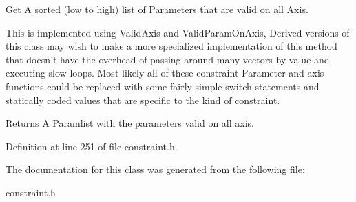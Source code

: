 Get A sorted (low to high) list of Parameters that are valid on all Axis. 

This is implemented using ValidAxis and ValidParamOnAxis, Derived versions of this class may wish to make a more specialized implementation of this method that doesn't have the overhead of passing around many vectors by value and executing slow loops. Most likely all of these constraint Parameter and axis functions could be replaced with some fairly simple switch statements and statically coded values that are specific to the kind of constraint. \begin{DoxyReturn}{Returns}
A Paramlist with the parameters valid on all axis. 
\end{DoxyReturn}


Definition at line 251 of file constraint.h.



The documentation for this class was generated from the following file:\begin{DoxyCompactItemize}
\item 
constraint.h\end{DoxyCompactItemize}
